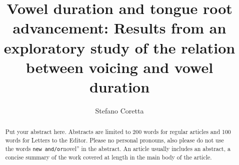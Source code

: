 \documentclass[]{JASAnew}
\begin{document}

\title[]{Vowel duration and tongue root advancement: Results from an exploratory
study of the relation between voicing and vowel duration}



\author{Stefano Coretta}






\begin{abstract}
Put your abstract here. Abstracts are limited to 200 words for regular
articles and 100 words for Letters to the Editor. Please no personal
pronouns, also please do not use the words
\texttt{new\textquotesingle{}\textquotesingle{}\ and/or}novel'' in the
abstract. An article usually includes an abstract, a concise summary of
the work covered at length in the main body of the article.
\end{abstract}


\maketitle


\end{document}
